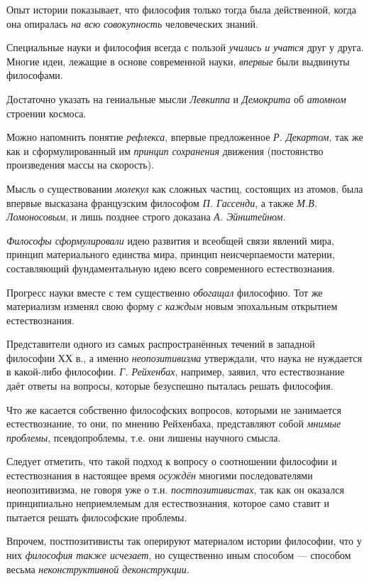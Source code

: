 \documentclass[a4paper,14pt,russian]{extreport}
\begin{document}
Опыт истории показывает, что философия только тогда была действенной, когда она опиралась \emph{на всю совокупность} человеческих знаний.

Специальные науки и философия всегда с пользой \emph{учились и учатся} друг у друга. Многие идеи, лежащие в основе современной науки, \emph{впервые} были выдвинуты философами.

Достаточно указать на гениальные мысли \emph{Левкиппа} и \emph{Демокрита} об \emph{атомном} строении космоса.

Можно напомнить понятие \emph{рефлекса}, впервые предложенное \emph{Р. Декартом}, так же как и сформулированный им \emph{принцип сохранения} движения (постоянство произведения массы на скорость).

Мысль о существовании \emph{молекул} как сложных частиц, состоящих из атомов, была впервые высказана французским философом \emph{П. Гассенди}, а также \emph{М.В. Ломоносовым}, и лишь позднее строго доказана \emph{А. Эйнштейном}.

\emph{Философы сформулировали} идею развития и всеобщей связи явлений мира, принцип материального единства мира, принцип неисчерпаемости материи, составляющий фундаментальную идею всего современного естествознания.

Прогресс науки вместе с тем существенно \emph{обогащал} философию. Тот же материализм изменял свою форму \emph{с каждым} новым эпохальным открытием естествознания.

Представители одного из самых распространённых течений в западной философии ХХ в., а именно \emph{неопозитивизма} утверждали, что наука не нуждается в какой-либо философии. \emph{Г. Рейхенбах}, например, заявил, что естествознание даёт ответы на вопросы, которые безуспешно пыталась решать философия.

Что же касается собственно философских вопросов, которыми не занимается естествознание, то они, по мнению Рейхенбаха, представляют собой \emph{мнимые проблемы}, псевдопроблемы, т.е. они лишены научного смысла.

Следует отметить, что такой подход к вопросу о соотношении философии и естествознания в настоящее время \emph{осуждён} многими последователями неопозитивизма, не говоря уже о т.н. \emph{постпозитивистах}, так как он оказался принципиально неприемлемым для естествознания, которое само ставит и пытается решать философские проблемы.

Впрочем, постпозитивисты так оперируют материалом истории философии, что у них \emph{философия также исчезает}, но существенно иным способом --- способом весьма \emph{неконструктивной деконструкции}.
\end{document}
